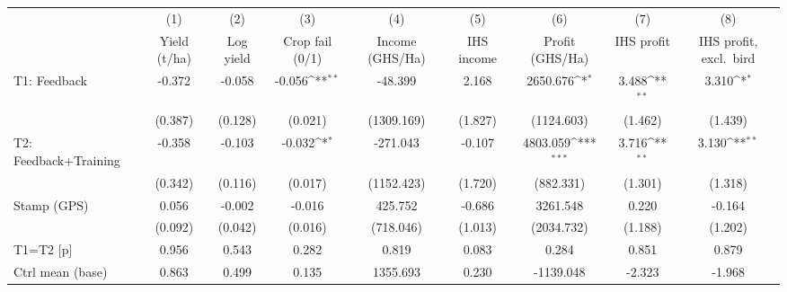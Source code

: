 {
\def\sym#1{\ifmmode^{#1}\else\(^{#1}\)\fi}
\begin{tabular}{l*{8}{c}}
\toprule
                    &\multicolumn{1}{c}{(1)}&\multicolumn{1}{c}{(2)}&\multicolumn{1}{c}{(3)}&\multicolumn{1}{c}{(4)}&\multicolumn{1}{c}{(5)}&\multicolumn{1}{c}{(6)}&\multicolumn{1}{c}{(7)}&\multicolumn{1}{c}{(8)}\\
                    &\multicolumn{1}{c}{Yield (t/ha)}&\multicolumn{1}{c}{Log yield}&\multicolumn{1}{c}{Crop fail (0/1)}&\multicolumn{1}{c}{Income (GHS/Ha)}&\multicolumn{1}{c}{IHS income}&\multicolumn{1}{c}{Profit (GHS/Ha)}&\multicolumn{1}{c}{IHS profit}&\multicolumn{1}{c}{IHS profit, excl.\ bird}\\
\midrule
T1: Feedback        &      -0.372         &      -0.058         &      -0.056\sym{**} &     -48.399         &       2.168         &    2650.676\sym{*}  &       3.488\sym{**} &       3.310\sym{*}  \\
                    &     (0.387)         &     (0.128)         &     (0.021)         &  (1309.169)         &     (1.827)         &  (1124.603)         &     (1.462)         &     (1.439)         \\
T2: Feedback+Training&      -0.358         &      -0.103         &      -0.032\sym{*}  &    -271.043         &      -0.107         &    4803.059\sym{***}&       3.716\sym{**} &       3.130\sym{**} \\
                    &     (0.342)         &     (0.116)         &     (0.017)         &  (1152.423)         &     (1.720)         &   (882.331)         &     (1.301)         &     (1.318)         \\
Stamp (GPS)         &       0.056         &      -0.002         &      -0.016         &     425.752         &      -0.686         &    3261.548         &       0.220         &      -0.164         \\
                    &     (0.092)         &     (0.042)         &     (0.016)         &   (718.046)         &     (1.013)         &  (2034.732)         &     (1.188)         &     (1.202)         \\
\midrule
T1=T2 [p]           &       0.956         &       0.543         &       0.282         &       0.819         &       0.083         &       0.284         &       0.851         &       0.879         \\
Ctrl mean (base)    &       0.863         &       0.499         &       0.135         &    1355.693         &       0.230         &   -1139.048         &      -2.323         &      -1.968         \\

\end{tabular}}
